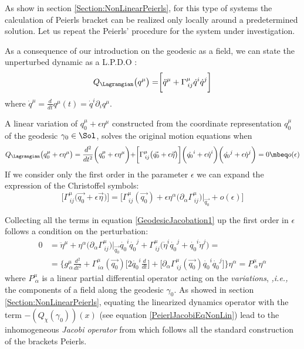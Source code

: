 \documentclass[Main]{subfiles}
\begin{document}
	As show in section \ref{Section:NonLinearPeierls}, for this type of systems the calculation of Peierls bracket can be realized only locally around a predetermined solution.
	Let us repeat the Peierls' procedure for the system under investigation.

	As a consequence of our introduction on the geodesic as a field, we can state the unperturbed dynamic as a L.P.D.O :
		\begin{equation}
			Q_\Lagrangian \big(q^\mu 	\big)= \biggr[\ddot{q}^\mu + \Gamma^\mu_{\, i j}\dot{q}^i \dot{q}^j	\biggr]
		\end{equation}
	where $\dot{q}^\mu = \frac{d}{dt}q^\mu(t)=\dot{q}^i\partial_i q^\mu$.
	
	A linear variation of $q_0^\mu +\epsilon \eta^\mu$ constructed from the coordinate representation $q_0^\mu$ of the geodesic $\gamma_0 \in \Sol$, solves the original motion equations when
	\begin{equation}\label{GeodesicJacobation1}
		Q_\Lagrangian \big( q_0^\mu +\epsilon \eta^\mu \big) = \frac{d^2}{dt^2}\biggr( q_0^\mu +\epsilon \eta^\mu \biggr) +
		\biggr[ \Gamma^\mu_{\, i j}\big( \vec{q_0} + \epsilon \vec{\eta}\big) \biggr]\biggr(\dot{q_0}^i +\epsilon \dot{\eta}^i \biggr)\biggr(\dot{q_0}^j +\epsilon \dot{\eta}^j \biggr) = 0 \mbeq o(\epsilon)
	\end{equation}
	If we consider only the first order in the parameter $\epsilon$ we can expand the expression of the Christoffel symbols:
	\begin{displaymath}
		\biggr[ \Gamma^\mu_{\, i j}\big( \vec{q_0} + \epsilon \vec{\eta}\big) \biggr] =
		\biggr[ \Gamma^\mu_{\, i j}( \vec{q_0}) + \epsilon \eta^\alpha\big( \partial_\alpha  \Gamma^\mu_{\, i j} \big)\biggr\vert_{\vec{q_0}} + o(\epsilon) \biggr]
	\end{displaymath}	 
	
	Collecting all the terms in equation \ref{GeodesicJacobation1} up the first order in $\epsilon$ follows a condition on the perturbation:
	\begin{align}\label{Eq:JacobiPeierlsEquation}
	0 &= \ddot{\eta}^\mu + \eta^\alpha\big( \partial_\alpha  \Gamma^\mu_{\, i j} \big)\biggr\vert_{\vec{q_0}} \dot{q_0}^i \dot{q_0}^j  +  \Gamma^\mu_{\, i j} \big(\dot{\eta}^i \dot{q_0}^j + \dot{q_0}^i \dot{\eta}^j \big)= \nonumber \\
	&=\biggr\{ g^\mu_{\,\alpha} \frac{d^2}{dt^2} +
	 \Gamma^\mu_{\, i \alpha}(\vec{q_0})\big[2 \dot{q_0}^i \frac{d}{dt} \big] + 
\big[ \partial_\alpha \Gamma^\mu_{\, i j}(\vec{q_0}) \dot{q_0}^i \dot{q_0}^j  \big] \biggr\} \eta^\alpha	= P^\mu_{\: \alpha} \eta^\alpha
	\end{align}		
	where $ P^\mu_{\: \alpha}$ is a linear partial differential operator acting on the \emph{variations}, \textit{,i.e.,} the components of a field along the geodesic $\gamma_0$.
	As showed in section \ref{Section:NonLinearPeierls}, equating the linearized dynamics operator with the term $-\left(Q_\chi(\gamma_0)\right)(x)$ 	(see equation \ref{PeierlJacobiEqNonLin}) lead to the inhomogeneous \emph{Jacobi operator} from which follows all the standard construction of the brackets Peierls.
\end{document}
